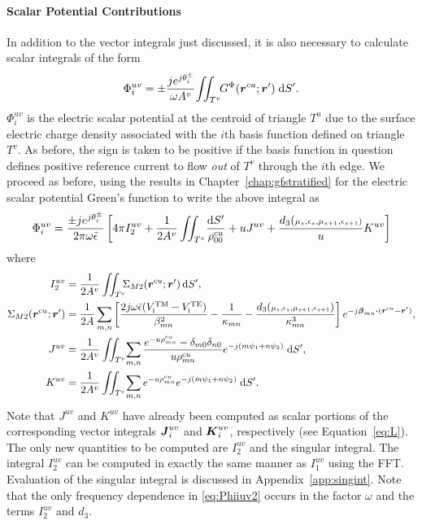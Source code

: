 \paragraph{Scalar Potential Contributions}
In addition to the vector integrals just discussed, it is also 
necessary to calculate scalar integrals of the form
\begin{equation}
  \Phi_i^{uv} = \pm \frac{je^{j\theta^{\pm}_i}}{\omega A^v} \!
  \iint_{T^v} \!\!
  {G}^{\Phi}(\boldsymbol{r}^{cu};\boldsymbol{r}') \; \text{d} S'.  \label{eq:Phiiuv}
\end{equation}
$\Phi_i^{uv}$ is the electric scalar potential at the centroid of
triangle $T^u$ due to the surface electric charge density associated with
the $i$th basis function defined on triangle $T^v$.  As before, the
sign is taken to be positive if the basis function in question defines
positive reference current to flow {\em out} of $T^v$ through the 
$i$th edge. 
We proceed as before, using the results in Chapter~\ref{chap:gfstratified} for the
electric scalar potential Green's function to write the above integral
as 
\begin{equation}
  \Phi_i^{uv} = \frac{\pm
    je^{j\theta^{\pm}_i}}{2\pi\omega\bar{\epsilon}} 
  \left[
     4\pi I_{2}^{uv} + 
     \frac{1}{2A^v}  \iint_{T^v}  \!
     \frac{\text{d} S'}{\rho^{\text{c}u}_{00}} +
     u J^{uv} +
     \frac{d_3(\scriptstyle\mu_s,\epsilon_s,\mu_{s+1},\epsilon_{s+1})}{u} 
     K^{uv}
   \right] \label{eq:Phiiuv2}
\end{equation}
where
\begin{subequations}
  \begin{align}
    I_{2}^{uv} &=
    \frac{1}{2A^v}  \iint_{T^v}  \!\!\!
    \Sigma_{M2}(\boldsymbol{r}^{\text{c}u};\boldsymbol{r}')
    \, \text{d} S', \\
    \Sigma_{M2}(\boldsymbol{r}^{\text{c}u};\boldsymbol{r}') & =
    \frac{1}{2A} \sum_{m,n} 
    \left[
      \frac{2j\omega\bar{\epsilon}(V_{\text{i}}^{\text{TM}}-V_{\text{i}}^{\text{TE}})}{\beta_{mn}^2} 
      - \frac{1}{\kappa_{mn}} -
      \frac{d_3({\scriptstyle\mu_s,\epsilon_s,\mu_{s+1},\epsilon_{s+1}})}
      {\kappa_{mn}^3}
    \right]  e^{-j\boldsymbol{\beta}_{mn}\boldsymbol{\cdot}(\boldsymbol{r}^{\text{c}u}-\boldsymbol{r}')}, \\
    J^{uv} &=
    \frac{1}{2A^v}  \iint_{T^v}  \!
    \sum_{m,n}  \frac{e^{-u\rho^{\text{c}u}_{mn}}-\delta_{m0}\delta_{n0}}{u\rho^{\text{c}u}_{mn}}  
    e^{-j(m\psi_1+n\psi_2)} \; \text{d} S', \\
    K^{uv} &=
    \frac{1}{2A^v}  \iint_{T^v}  \!
    \sum_{m,n}  e^{-u\rho^{\text{c}u}_{mn}}
    e^{-j(m\psi_1+n\psi_2)} \; \text{d} S'.
  \end{align}
\end{subequations}
Note that $J^{uv}$ and $K^{uv}$ have already been computed as
scalar portions of the corresponding vector integrals 
$\boldsymbol{J}_{i}^{uv}$ and $\boldsymbol{K}_{i}^{uv}$, respectively (see Equation~\ref{eq:L}).
The only new quantities to be computed are $I_{2}^{uv}$ and the singular
integral. The integral $I_{2}^{uv}$ can be computed in exactly
the same manner as $I_{1}^{uv}$ using the FFT. Evaluation of the singular 
integral is discussed in Appendix~\ref{app:singint}.
 Note that the
only frequency dependence in \eqref{eq:Phiiuv2} occurs in the 
factor $\omega$ and the terms $I_{2}^{uv}$ and $d_3$. 


